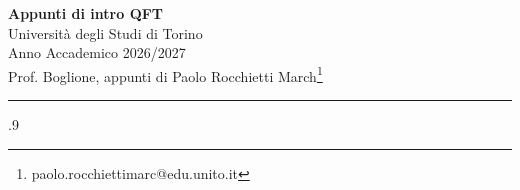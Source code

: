 \documentclass[a4paper,11pt]{article}
\begin{document}
\begin{center}
\Large{\textbf{Appunti di intro QFT}}
\vspace{0.4cm}
\normalsize
\\ Università degli Studi di Torino\\Anno Accademico 2026/2027 \\Prof. Boglione,
appunti di Paolo Rocchietti March\footnote{paolo.rocchiettimarc@edu.unito.it} \\

\vspace{0.1cm}
\medskip
\normalsize
\end{center}
\vspace{0.4cm}
{\color{gray}\hrule}
\null\vfill
\vfill\null
\newpage
\begin{spacing}{.9}
\tableofcontents
\end{spacing}
\newpage
\pagestyle{fancy}
\thispagestyle{fancy}
\fancyfoot[C]{\small{\thepage}}
%

\end{document}
